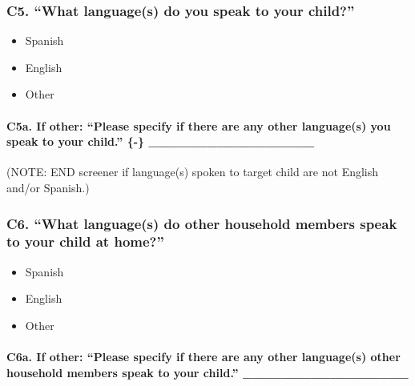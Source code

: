 \documentclass[
  12pt,
]{book}
\providecommand{\tightlist}{%
  \setlength{\itemsep}{0pt}\setlength{\parskip}{0pt}}
\begin{document}
\hypertarget{c5.-what-languages-do-you-speak-to-your-child}{%
\subsubsection*{C5. ``What language(s) do you speak to your child?''}\label{c5.-what-languages-do-you-speak-to-your-child}}

\begin{itemize}
\tightlist
\item
  Spanish
\item
  English
\item
  Other
\end{itemize}

\hypertarget{c5a.-if-other-please-specify-if-there-are-any-other-languages-you-speak-to-your-child.---_________________}{%
\paragraph{C5a. If other: ``Please specify if there are any other language(s) you speak to your child.'' \{-\} \_\_\_\_\_\_\_\_\_\_\_\_\_\_\_\_\_}\label{c5a.-if-other-please-specify-if-there-are-any-other-languages-you-speak-to-your-child.---_________________}}

(NOTE: END screener if language(s) spoken to target child are not English and/or Spanish.)

\hypertarget{c6.-what-languages-do-other-household-members-speak-to-your-child-at-home}{%
\subsubsection*{C6. ``What language(s) do other household members speak to your child at home?''}\label{c6.-what-languages-do-other-household-members-speak-to-your-child-at-home}}

\begin{itemize}
\tightlist
\item
  Spanish
\item
  English
\item
  Other
\end{itemize}

\hypertarget{c6a.-if-other-please-specify-if-there-are-any-other-languages-other-household-members-speak-to-your-child.-_________________}{%
\paragraph*{C6a. If other: ``Please specify if there are any other language(s) other household members speak to your child.'' \_\_\_\_\_\_\_\_\_\_\_\_\_\_\_\_\_}\label{c6a.-if-other-please-specify-if-there-are-any-other-languages-other-household-members-speak-to-your-child.-_________________}}
\end{document}
